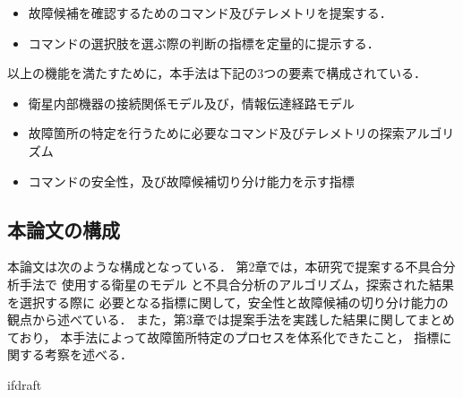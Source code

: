 \documentclass[11pt]{jsreport}
\begin{document}
\begin{itemize}
  \item 故障候補を確認するためのコマンド及びテレメトリを提案する．
  \item コマンドの選択肢を選ぶ際の判断の指標を定量的に提示する．
\end{itemize}
以上の機能を満たすために，本手法は下記の3つの要素で構成されている．
\begin{itemize}
   \item 衛星内部機器の接続関係モデル及び，情報伝達経路モデル
   \item 故障箇所の特定を行うために必要なコマンド及びテレメトリの探索アルゴリズム %
   \item コマンドの安全性，及び故障候補切り分け能力を示す指標
\end{itemize}

\subsection{本論文の構成}
本論文は次のような構成となっている．
第2章では，本研究で提案する不具合分析手法で
使用する衛星のモデル%
と不具合分析のアルゴリズム，探索された結果を選択する際に
必要となる指標に関して，安全性と故障候補の切り分け能力の観点から述べている．
また，第3章では提案手法を実践した結果に関してまとめており，
本手法によって故障箇所特定のプロセスを体系化できたこと，
指標に関する考察を述べる．

\expandafter\ifx\csname ifdraft\endcsname\relax
\end{document}
